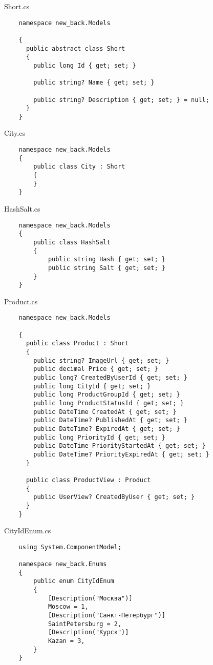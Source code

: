 Short.cs
\lstset{style=sharpc}
\begin{lstlisting}
    namespace new_back.Models

    {
      public abstract class Short
      {
        public long Id { get; set; }
    
        public string? Name { get; set; }
    
        public string? Description { get; set; } = null;
      }
    }
\end{lstlisting}

City.cs
\lstset{style=sharpc}
\begin{lstlisting}
    namespace new_back.Models
    {
        public class City : Short
        {
        }
    }
\end{lstlisting}

HashSalt.cs
\lstset{style=sharpc}
\begin{lstlisting}
    namespace new_back.Models
    {
        public class HashSalt
        {
            public string Hash { get; set; }
            public string Salt { get; set; }
        }
    }
\end{lstlisting}

Product.cs
\lstset{style=sharpc}
\begin{lstlisting}
    namespace new_back.Models

    {
      public class Product : Short
      {
        public string? ImageUrl { get; set; }
        public decimal Price { get; set; }
        public long? CreatedByUserId { get; set; }
        public long CityId { get; set; }
        public long ProductGroupId { get; set; }
        public long ProductStatusId { get; set; }
        public DateTime CreatedAt { get; set; }
        public DateTime? PublishedAt { get; set; }
        public DateTime? ExpiredAt { get; set; }
        public long PriorityId { get; set; }
        public DateTime PriorityStartedAt { get; set; }
        public DateTime? PriorityExpiredAt { get; set; }
      }
      
      public class ProductView : Product
      {
        public UserView? CreatedByUser { get; set; }
      }
    }
\end{lstlisting}

CityIdEnum.cs
\lstset{style=sharpc}
\begin{lstlisting}
    using System.ComponentModel;
    
    namespace new_back.Enums
    {
        public enum CityIdEnum
        {
            [Description("Москва")]
            Moscow = 1,
            [Description("Санкт-Петербург")]
            SaintPetersburg = 2,
            [Description("Курск")]
            Kazan = 3,
        }
    }    
\end{lstlisting}

